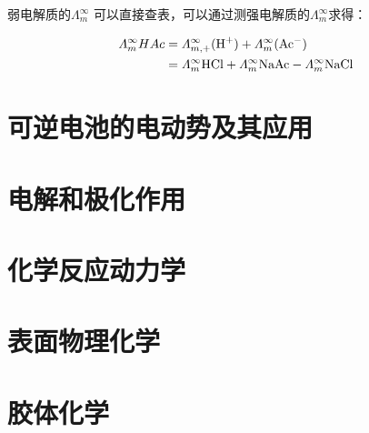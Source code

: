 \documentclass[a4paper]{ctexrep}
\begin{document}
        弱电解质的$\varLambda_m^\infty$ 可以直接查表，可以通过测强电解质的$\varLambda_m^\infty$求得：

        \begin{align*}
            \varLambda_m^\infty{HAc} &= \varLambda_{m, +}^\infty(\ce{H+}) + \varLambda_m^\infty(\ce{Ac-}) \\
            &= \varLambda_m^\infty{\ce{HCl}} + \varLambda_m^\infty{\ce{NaAc}} - \varLambda_m^\infty{\ce{NaCl}}
        \end{align*}
            

    \chapter{可逆电池的电动势及其应用}

    \chapter{电解和极化作用}

    \chapter{化学反应动力学}

    \chapter{表面物理化学}

    \chapter{胶体化学}
\end{document}
